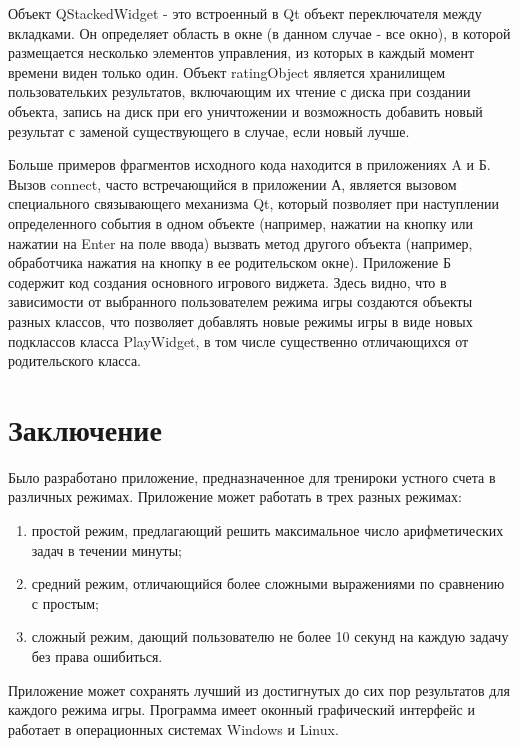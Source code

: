 \documentclass[a4paper,12pt]{article}
\begin{document}
Объект QStackedWidget - это встроенный в Qt объект переключателя между вкладками.
Он определяет область в окне (в данном случае - все окно), в которой размещается
несколько элементов управления, из которых в каждый момент времени виден только один.
Объект ratingObject является хранилищем пользовательких результатов, включающим их
чтение с диска при создании объекта, запись на диск при его уничтожении и возможность
добавить новый результат с заменой существующего в случае, если новый лучше.

Больше примеров фрагментов исходного кода находится в приложениях A и Б. Вызов connect,
часто встречающийся в приложении А, является вызовом специального связывающего
механизма Qt, который позволяет при наступлении определенного события в одном
объекте (например, нажатии на кнопку или нажатии на Enter на поле ввода) вызвать
метод другого объекта (например, обработчика нажатия на кнопку в ее родительском
окне). Приложение Б содержит код создания основного игрового виджета. Здесь видно,
что в зависимости от выбранного пользователем режима игры создаются объекты разных
классов, что позволяет добавлять новые режимы игры в виде новых подклассов класса
PlayWidget, в том числе существенно отличающихся от родительского класса.



\newpage
\section*{Заключение}

Было разработано приложение, предназначенное для тренироки устного счета в различных
режимах. Приложение может работать в трех разных режимах:

\begin{enumerate}
\item	простой режим, предлагающий решить максимальное число арифметических
	задач в течении минуты;
\item	средний режим, отличающийся более сложными выражениями по сравнению
	с простым;
\item	сложный режим, дающий пользователю не более 10 секунд на каждую задачу
	без права ошибиться.
\end{enumerate}

Приложение может сохранять лучший из достигнутых до сих пор результатов для
каждого режима игры. Программа имеет оконный графический интерфейс и работает в
операционных системах Windows и Linux.
\end{document}
